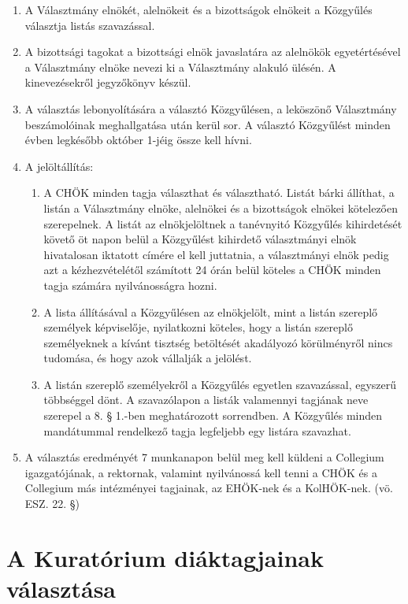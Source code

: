 \documentclass{rulebook}
\begin{document}
\begin{enumerate}
	\item A Választmány elnökét, alelnökeit és a bizottságok elnökeit a Közgyűlés választja listás szavazással.
	\item A bizottsági tagokat a bizottsági elnök javaslatára az alelnökök egyetértésével a Választmány elnöke nevezi ki a Választmány alakuló ülésén. A kinevezésekről jegyzőkönyv készül.
	\item A választás lebonyolítására a választó Közgyűlésen, a leköszönő Választmány beszámolóinak meghallgatása után kerül sor. A választó Közgyűlést minden évben legkésőbb október 1-jéig össze kell hívni.
	\item A jelöltállítás:
	\begin{enumerate}
		\item A CHÖK minden tagja választhat és választható. Listát bárki állíthat, a listán a Választmány elnöke, alelnökei és a bizottságok elnökei kötelezően szerepelnek. A listát az elnökjelöltnek a tanévnyitó Közgyűlés kihirdetését követő öt napon belül a Közgyűlést kihirdető választmányi elnök hivatalosan iktatott címére el kell juttatnia, a választmányi elnök pedig azt a kézhezvételétől számított 24 órán belül köteles a CHÖK minden tagja számára nyilvánosságra hozni.
		\item A lista állításával a Közgyűlésen az elnökjelölt, mint a listán szereplő személyek képviselője, nyilatkozni köteles, hogy a listán szereplő személyeknek a kívánt tisztség betöltését akadályozó körülményről nincs tudomása, és hogy azok vállalják a jelölést.
		\item A listán szereplő személyekről a Közgyűlés egyetlen szavazással, egyszerű többséggel dönt. A szavazólapon a listák valamennyi tagjának neve szerepel a 8. § 1.-ben meghatározott sorrendben. A Közgyűlés minden mandátummal rendelkező tagja legfeljebb egy listára szavazhat.
	\end{enumerate}
	\item A választás eredményét 7 munkanapon belül meg kell küldeni a Collegium igazgatójának, a rektornak, valamint nyilvánossá kell tenni a CHÖK és a Collegium más intézményei tagjainak, az EHÖK-nek és a KolHÖK-nek. (vö. ESZ. 22. §)
\end{enumerate}


\section{A Kuratórium diáktagjainak választása}
\end{document}
